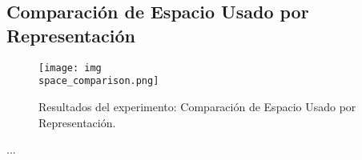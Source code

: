 \subsection{Comparación de Espacio Usado por Representación}
\label{exp:space-comparison}

\begin{figure}[H]
    \centering
    \texttt{[image: img\\space\_comparison.png]}
    \caption{Resultados del experimento: Comparación de Espacio Usado por Representación.}
    \label{fig:space-comparison}
\end{figure}

...
